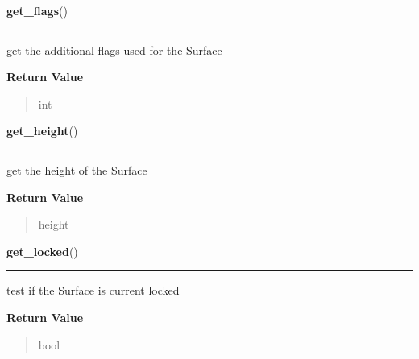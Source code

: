 \hspace{.8\funcindent}\begin{boxedminipage}{\funcwidth}

    \raggedright \textbf{get\_flags}()

    \vspace{-1.5ex}

    \rule{\textwidth}{0.5\fboxrule}
\setlength{\parskip}{2ex}
    get the additional flags used for the Surface

\setlength{\parskip}{1ex}
      \textbf{Return Value}
    \vspace{-1ex}

      \begin{quote}
      int

      \end{quote}

    \end{boxedminipage}

    \label{pygame:Surface:get_height}

    \vspace{0.5ex}

\hspace{.8\funcindent}\begin{boxedminipage}{\funcwidth}

    \raggedright \textbf{get\_height}()

    \vspace{-1.5ex}

    \rule{\textwidth}{0.5\fboxrule}
\setlength{\parskip}{2ex}
    get the height of the Surface

\setlength{\parskip}{1ex}
      \textbf{Return Value}
    \vspace{-1ex}

      \begin{quote}
      height

      \end{quote}

    \end{boxedminipage}

    \label{pygame:Surface:get_locked}

    \vspace{0.5ex}

\hspace{.8\funcindent}\begin{boxedminipage}{\funcwidth}

    \raggedright \textbf{get\_locked}()

    \vspace{-1.5ex}

    \rule{\textwidth}{0.5\fboxrule}
\setlength{\parskip}{2ex}
    test if the Surface is current locked

\setlength{\parskip}{1ex}
      \textbf{Return Value}
    \vspace{-1ex}

      \begin{quote}
      bool

      \end{quote}

    \end{boxedminipage}

